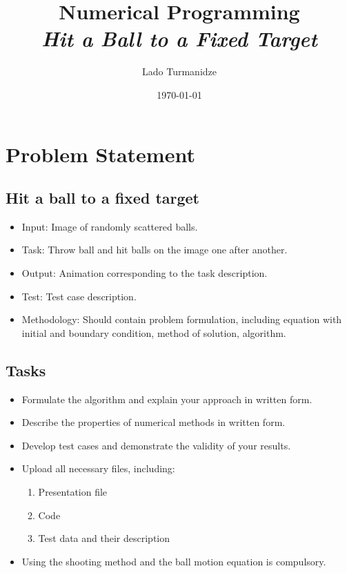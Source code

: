 \documentclass{article}
\begin{document}
	
	
	\title{\textbf{Numerical Programming} \\ \textit{Hit a Ball to a Fixed Target}}
	\author{Lado \Bat \space Turmanidze}
	\date{\today}

	\maketitle
	
	
	\section*{Problem Statement}
	
	\subsection*{Hit a ball to a fixed target \Circpipe}
		
		\begin{itemize}
			\item[\ding{101}] Input: Image of randomly scattered balls.
			\item[\ding{101}] Task: Throw ball and hit balls on the image one after another.
			\item[\ding{101}] Output: Animation corresponding to the task description.
			\item[\ding{101}] Test: Test case description.
			\item[\ding{101}] Methodology: Should contain problem formulation, including equation with initial and boundary condition, method of solution, algorithm.
		\end{itemize}	
	
	\subsection*{Tasks}
		
		\begin{itemize}
			\item[\ding{100}] Formulate the algorithm and explain your approach in written form.
			\item[\ding{100}] Describe the properties of numerical methods in written form.
			\item[\ding{100}] Develop test cases and demonstrate the validity of your results.
			\item[\ding{100}] Upload all necessary files, including: 
			\begin{enumerate} 
				\item Presentation file 
				\item Code 
				\item Test data and their description 
			\end{enumerate}
			\item[\ding{100}] Using the shooting method and the ball motion equation is compulsory.
		\end{itemize}
\end{document}
